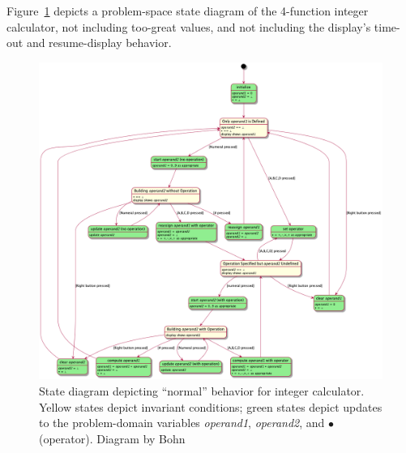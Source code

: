 Figure~\ref{fig:StateDiagram} depicts a problem-space state diagram of the
4-function integer calculator, not including too-great values, and not
including the display's time-out and resume-display behavior.

\begin{figure}
    \centering
    \includegraphics[width=18cm]{CalculatorStateDiagram}
    \caption{State diagram depicting ``normal'' behavior for integer calculator. Yellow states depict invariant conditions; green states depict updates to the problem-domain variables \textit{operand1}, \textit{operand2}, and $\bullet$ (operator). \tiny Diagram by Bohn \label{fig:StateDiagram}}
\end{figure}

